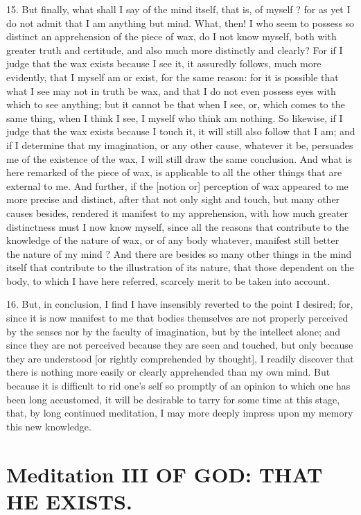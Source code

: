 15. But finally, what shall I say of the mind itself, that is, of myself ? for as yet I do not admit that I am anything but mind. What, then! I who seem to possess so distinct an apprehension of the piece of wax, do I not know myself, both with greater truth and certitude, and also much more distinctly and clearly? For if I judge that the wax exists because I see it, it assuredly follows, much more evidently, that I myself am or exist, for the same reason: for it is possible that what I see may not in truth be wax, and that I do not even possess eyes with which to see anything; but it cannot be that when I see, or, which comes to the same thing, when I think I see, I myself who think am nothing. So likewise, if I judge that the wax exists because I touch it, it will still also follow that I am; and if I determine that my imagination, or any other cause, whatever it be, persuades me of the existence of the wax, I will still draw the same conclusion. And what is here remarked of the piece of wax, is applicable to all the other things that are external to me. And further, if the [notion or] perception of wax appeared to me more precise and distinct, after that not only sight and touch, but many other causes besides, rendered it manifest to my apprehension, with how much greater distinctness must I now know myself, since all the reasons that contribute to the knowledge of the nature of wax, or of any body whatever, manifest still better the nature of my mind ? And there are besides so many other things in the mind itself that contribute to the illustration of its nature, that those dependent on the body, to which I have here referred, scarcely merit to be taken into account.

16. But, in conclusion, I find I have insensibly reverted to the point I desired; for, since it is now manifest to me that bodies themselves are not properly perceived by the senses nor by the faculty of imagination, but by the intellect alone; and since they are not perceived because they are seen and touched, but only because they are understood [or rightly comprehended by thought], I readily discover that there is nothing more easily or clearly apprehended than my own mind. But because it is difficult to rid one's self so promptly of an opinion to which one has been long accustomed, it will be desirable to tarry for some time at this stage, that, by long continued meditation, I may more deeply impress upon my memory this new knowledge.


\section{Meditation III OF GOD: THAT HE EXISTS.}

